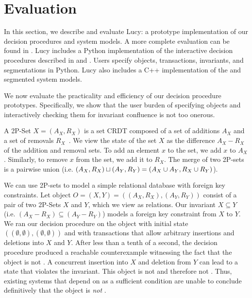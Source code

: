 \section{Evaluation}
In this section, we describe and evaluate Lucy: a prototype implementation of
our decision procedures and system models. A more complete evaluation can be
found in \cite{whittaker2018interactive}.
%
Lucy includes a Python implementation of the interactive decision procedures
described in  and
. Users
specify objects, transactions, invariants, and segmentations in Python.
%
Lucy also includes a C++ implementation of the \invariantconfluence{} and
segmented \invariantconfluence{} system models.

We now evaluate the practicality and efficiency of our decision procedure
prototypes. Specifically, we show that the user burden of specifying objects
and interactively checking them for invariant confluence is not too onerous.

A 2P-Set $X = (A_X, R_X)$ is a set CRDT composed of a set of additions $A_X$
and a set of removals $R_X$~\cite{shapiro2011comprehensive}. We view the state
of the set $X$ as the difference $A_X - R_X$ of the addition and removal sets.
To add an element $x$ to the set, we add $x$ to $A_X$. Similarly, to remove $x$
from the set, we add it to $R_X$. The merge of two 2P-sets is a pairwise union
(i.e. $(A_X, R_X) \sqcup (A_Y, R_Y) = (A_X \cup A_Y, R_X \cup R_Y)$).

We can use 2P-sets to model a simple relational database with foreign key
constraints. Let object $O = (X, Y) = ((A_X, R_X), (A_Y, R_Y))$ consist of a
pair of two 2P-Sets $X$ and $Y$, which we view as relations. Our invariant $X
\subseteq Y$ (i.e. $(A_X - R_X) \subseteq (A_Y - R_Y)$) models a foreign key
constraint from $X$ to $Y$. We ran our decision procedure on the object with
initial state $((\emptyset, \emptyset), (\emptyset, \emptyset))$ and with
transactions that allow arbitrary insertions and deletions into $X$ and $Y$.
After less than a tenth of a second, the decision procedure produced a
reachable counterexample witnessing the fact that the object is not
\invariantconfluent{}. A concurrent insertion into $X$ and deletion from $Y$
can lead to a state that violates the invariant. This object is not
\invariantconfluent{} and therefore not \invariantclosed{}.
Thus, existing systems that depend on \invariantclosure{} as a sufficient
condition are unable to conclude definitively that the object is \emph{not}
\invariantconfluent{}.

